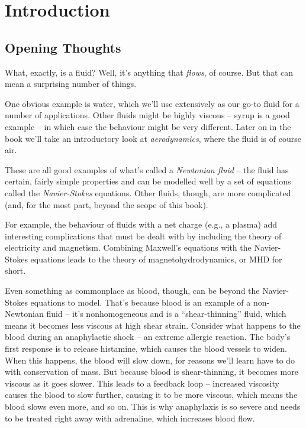 \chapter{Introduction}

\section{Opening Thoughts}

What, exactly, is a fluid? Well, it's anything that \emph{flows}, of course. But that can mean a surprising number of things.

One obvious example is water, which we'll use extensively as our go-to fluid for a number of applications. Other fluids might be highly viscous -- syrup is a good example -- in which case the behaviour might be very different.  Later on in the book we'll take an introductory look at \emph{aerodynamics}, where the fluid is of course air.  

These are all good examples of what's called a \emph{Newtonian fluid} -- the fluid has certain, fairly simple properties and can be modelled well by a set of equations called the \emph{Navier-Stokes} equations.  Other fluids, though, are more complicated (and, for the most part, beyond the scope of this book).

For example, the behaviour of fluids with a net charge (e.g., a plasma) add interesting complications that must be dealt with by including the theory of electricity and magnetism.  Combining Maxwell's equations with the Navier-Stokes equations leads to the theory of magnetohydrodynamics, or MHD for short.

Even something as commonplace as blood, though, can be beyond the Navier-Stokes equations to model.  That's because blood is an example of a non-Newtonian fluid -- it's nonhomogeneous and is a ``shear-thinning'' fluid, which means it becomes less viscous at high shear strain.  Consider what happens to the blood during an anaphylactic shock -- an extreme allergic reaction.  The body's first response is to release histamine, which causes the blood vessels to widen.  When this happens, the blood will slow down, for reasons we'll learn have to do with conservation of mass.  But because blood is shear-thinning, it becomes more viscous as it goes slower.  This leads to a feedback loop -- increased viscosity causes the blood to slow further, causing it to be more viscous, which means the blood slows even more, and so on.  This is why anaphylaxis is so severe and needs to be treated right away with adrenaline, which increases blood flow.

